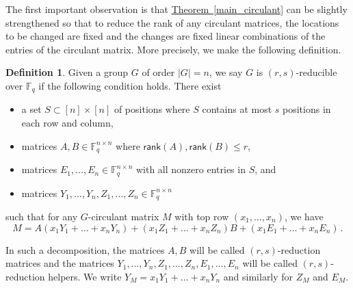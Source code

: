 \documentclass[11pt]{article}
\numberwithin{equation}{section}
\theoremstyle{definition}
\theoremstyle{plain}
\newcommand{\expref}[2]{\hyperref[#2]{#1~\ref{#2}}}
\theoremstyle{definition}
\newtheorem{define}[theorem]{Definition}
\newcommand\F{{\mathbb{F}}}
\newcommand\rank{\textsf{rank}}
\begin{document}
The first important observation is that \expref{Theorem}{main_circulant} can be slightly strengthened so that to reduce the rank of any circulant matrices, the locations to be changed are fixed and the changes are fixed linear combinations of the entries of the circulant matrix.  More precisely, we make the following definition.
\begin{define}\label{group_reducibility}
Given a group $G$   %
of order   %
$|G| = n$, we say $G$ is $(r,s)$-reducible over
$\F_q$ if the following %
condition holds.   %
%
%
%
%
%
%
%
%
%
%
%
%
There exist
\begin{itemize}
\item a set $S \subset [n] \times [n]$ of positions where $S$
  contains at most $s$
  positions in each row and column,
\item  matrices $A,B \in \F_q^{n\times n}$ where
   $\rank(A), \rank(B) \leq r$,
\item matrices $E_1, \dots , E_n \in \F_q^{n \times n}$ with
  all nonzero entries in $S$, and
\item matrices $Y_1, \dots , Y_n, Z_1, \dots , Z_n \in \F_q^{n \times n}$ 
\end{itemize}
such that for any $G$-circulant matrix $M$ with top row
%
$(x_1, \dots , x_n)$, we have  %
    \[
    M = A(x_1Y_1 + \dots + x_nY_n) + (x_1Z_1 + \dots + x_nZ_n)B + (x_1E_1 + \dots + x_nE_n) \,.
    \]

%
In such a decomposition, the matrices $A,B$ will be called $(r,s)$-reduction matrices and the matrices
$Y_1, \dots , Y_n,Z_1, \dots , Z_n, E_1, \dots , E_n$ will be called
$(r,s)$-reduction helpers. %
%
%
%
We write $Y_M = x_1Y_1 + \dots + x_nY_n$ and
%
similarly  %
for $Z_M$ and $E_M$.
\end{define}
\end{document}
